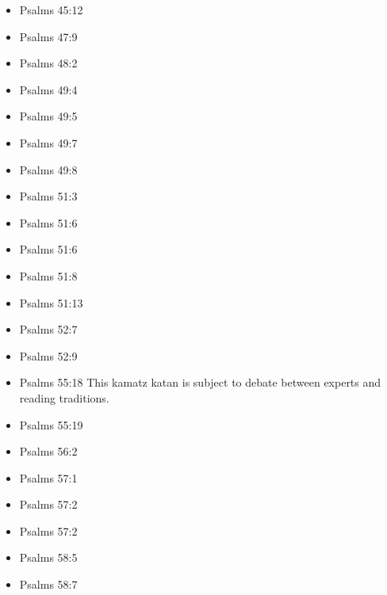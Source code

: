\documentclass[14pt]{article}
\begin{document}
\begin{multicols}{2}
\begin{itemize}
\item Psalms 45:12

\item Psalms 47:9

\item Psalms 48:2

\item Psalms 49:4

\item Psalms 49:5

\item Psalms 49:7

\item Psalms 49:8

\item Psalms 51:3

\item Psalms 51:6

\item Psalms 51:6

\item Psalms 51:8

\item Psalms 51:13


\item Psalms 52:7
	
	\item Psalms 52:9
	
	\item Psalms 55:18 This kamatz katan is subject to debate between experts and reading traditions.
	
	\item Psalms 55:19
	
	\item Psalms 56:2
	
	\item Psalms 57:1

\item Psalms 57:2

\item Psalms 57:2

\item Psalms 58:5

\item Psalms 58:7


\end{itemize}
\end{multicols}
\end{document}
